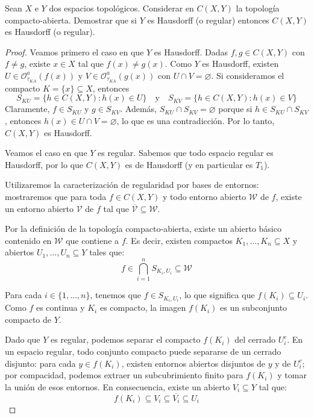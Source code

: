 \documentclass{article}
\theoremstyle{plain}
\theoremstyle{definition}
\newenvironment{ejercicio}[1]{\begin{trivlist}
\item[\hskip \labelsep {\bfseries Ejercicio}\hskip \labelsep {\bfseries #1.}]}{\end{trivlist}}
\begin{document}
\begin{ejercicio}{2}
    Sean \( X \) e \( Y \) dos espacios topológicos. Considerar en \( C(X,Y) \) la topología compacto-abierta. Demostrar que si \( Y \) es Hausdorff (o regular) entonces \( C(X,Y) \) es Hausdorff (o regular).
\end{ejercicio}
\begin{proof}
    Veamos primero el caso en que \( Y \) es Hausdorff.
    Dadas \( f, g \in C(X, Y) \) con \( f \neq g \), existe \( x \in X \) tal que
    \( f(x) \neq g(x) \). Como \( Y \) es Hausdorff, existen \( U \in \mathcal{O}^a_{\tau_{KA}}(f(x)) \) y \( V \in \mathcal{O}^a_{\tau_{KA}}(g(x)) \) con \( U \cap V = \varnothing \).
    Si consideramos el compacto \( K = \{ x \} \subseteq X \), entonces \[
        S_{KU} = \{ h \in C(X, Y) : h(x) \in U \} \quad \text{y} \quad S_{KV} = \{ h \in C(X, Y) : h(x) \in V \}
    \]
    Claramente, \( f \in S_{KU} \) y \( g \in S_{KV} \). Además, \( S_{KU} \cap S_{KV} = \varnothing \) porque si \( h \in S_{KU} \cap S_{KV} \), entonces \( h(x) \in U \cap V = \varnothing \), lo que es una contradicción. Por lo tanto, \( C(X, Y) \) es Hausdorff.


    Veamos el caso en que \( Y \) es regular. Sabemos que todo espacio regular es Hausdorff, por lo que \( C(X,Y) \) es de Hausdorff (y en particular es \( T_1 \)).

    Utilizaremos la caracterización de regularidad por bases de entornos: mostraremos que para toda \( f \in C(X, Y) \) y todo entorno abierto \( \mathcal{W} \) de \( f \), existe un entorno abierto \( \mathcal{V} \) de \( f \) tal que \( \overline{\mathcal{V}} \subseteq \mathcal{W} \).

    Por la definición de la topología compacto-abierta, existe un abierto básico contenido en \( \mathcal{W} \) que contiene a \( f \). Es decir, existen compactos \( K_1, \dots, K_n \subseteq X \) y abiertos \( U_1, \dots, U_n \subseteq Y \) tales que:
    \[
        f \in \bigcap_{i=1}^n S_{K_i, U_i} \subseteq \mathcal{W}
    \]

    Para cada \( i \in \{1, \dots, n\} \), tenemos que \( f \in S_{K_i, U_i} \), lo que significa que \( f(K_i) \subseteq U_i \). Como \( f \) es continua y \( K_i \) es compacto, la imagen \( f(K_i) \) es un subconjunto compacto de \( Y \).

    Dado que \( Y \) es regular, podemos separar el compacto \( f(K_i) \) del cerrado \( U_i^c \). En un espacio regular, todo conjunto compacto puede separarse de un cerrado disjunto: para cada \( y \in f(K_i) \), existen entornos abiertos disjuntos de \( y \) y de \( U_i^c \); por compacidad, podemos extraer un subcubrimiento finito para \( f(K_i) \) y tomar la unión de esos entornos. En consecuencia, existe un abierto \( V_i \subseteq Y \) tal que:
    \[
        f(K_i) \subseteq V_i \subseteq \overline{V_i} \subseteq U_i
    \]


\end{proof}
\end{document}
